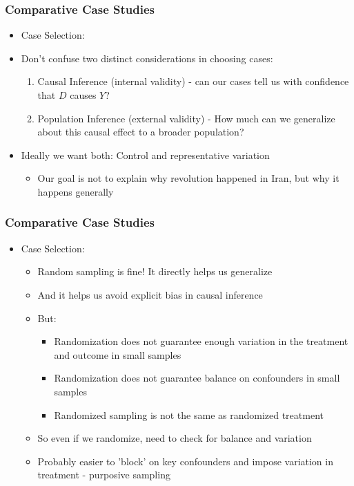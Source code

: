 \documentclass[xcolor=x11names,compress]{beamer}\usepackage[]{graphicx}\usepackage[]{color}
\renewcommand{\(}{\begin{columns}}
\renewcommand{\)}{\end{columns}}
\newcommand{\<}[1]{\begin{column}{#1}}
\renewcommand{\>}{\end{column}}
\begin{document}
\begin{frame}
\frametitle{Comparative Case Studies}
\begin{itemize}
\item Case Selection:
\pause
\item Don't confuse two distinct considerations in choosing cases:
\pause
\begin{enumerate}
\item Causal Inference (internal validity) - can our cases tell us with confidence that $D$ causes $Y$?
\pause
\item Population Inference (external validity) - How much can we generalize about this causal effect to a broader population?
\end{enumerate}
\item Ideally we want both: Control and representative variation
\begin{itemize}
\item Our goal is not to explain why revolution happened in Iran, but why it happens generally
\end{itemize}
\end{itemize}
\end{frame}

\begin{frame}
\frametitle{Comparative Case Studies}
\begin{itemize}
\item Case Selection:
\pause
\begin{itemize}
\item Random sampling is fine! It directly helps us generalize
\pause
\item And it helps us avoid explicit bias in causal inference
\pause
\item But:
\pause
\begin{itemize}
\item Randomization does not guarantee enough variation in the treatment and outcome in small samples
\pause
\item Randomization does not guarantee balance on confounders in small samples
\pause
\item Randomized sampling is not the same as randomized treatment
\end{itemize}
\item So even if we randomize, need to check for balance and variation
\pause
\item Probably easier to 'block' on key confounders and impose variation in treatment - purposive sampling
\end{itemize}
\end{itemize}
\end{frame}
\end{document}
